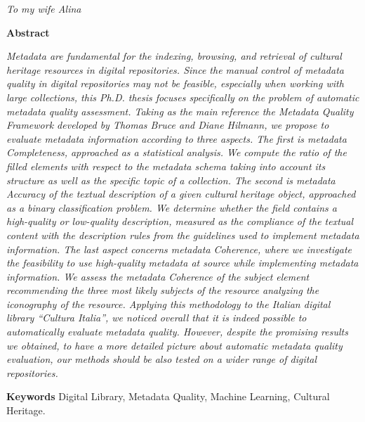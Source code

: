 \documentclass[epsfig,a4paper,12pt,titlepage]{book}
\newcommand{\clearemptydoublepage}{\newpage{\pagestyle{empty}\cleardoublepage}}
\begin{document}
\newpage
\begin{flushright}
\textit{To my wife Alina}
\end{flushright}
\clearemptydoublepage
\thispagestyle{empty}
\large

{\bf \Huge Abstract}

\vspace{0.1cm}

\noindent
\emph{
Metadata are fundamental for the indexing, browsing, and retrieval of cultural heritage resources in digital repositories. Since the manual control of metadata quality in digital repositories may not be feasible, especially when working with large collections, this Ph.D. thesis focuses specifically on the problem of automatic metadata quality assessment. Taking as the main reference the Metadata Quality Framework developed by Thomas Bruce and Diane Hilmann, we propose to evaluate metadata information according to three aspects. The first is metadata Completeness, approached as a statistical analysis. We compute the ratio of the filled elements with respect to the metadata schema taking into account its structure as well as the specific topic of a collection. The second is metadata Accuracy of the textual description of a given cultural heritage object, approached as a binary classification problem. We determine whether the field contains a high-quality or low-quality description, measured as the compliance of the textual content with the  description rules from the guidelines used to implement metadata information. The last aspect concerns metadata Coherence, where we investigate the feasibility to use high-quality metadata at source while implementing metadata information. We assess  the  metadata Coherence of  the  subject element recommending the three most likely subjects of the resource analyzing the iconography of the resource. Applying this methodology to the Italian digital library ``Cultura Italia'', we noticed overall that it is indeed possible to automatically evaluate metadata quality. However, despite the promising results we obtained, to have a more detailed picture about automatic metadata quality evaluation, our methods should be also tested on a wider range of digital repositories.
}

 

\vspace{0.1cm}
\noindent
{\bf Keywords}
\noindent
Digital Library, Metadata Quality, Machine Learning, Cultural Heritage.
\clearemptydoublepage

\tableofcontents
\clearemptydoublepage
\listoftables
\clearemptydoublepage
\listoffigures
\clearemptydoublepage
\pagestyle{fancy}
\renewcommand{\chaptermark}[1]{%
\markboth{\MakeUppercase{%
\chaptername\ \thechapter.%
\ #1}}{}}
\end{document}
